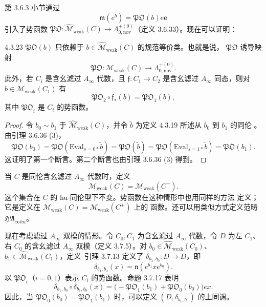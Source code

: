 第 3.6.3 小节通过
\[
 \mathfrak m(e^b)=\mathfrak{PO}(b)e\mathbf e
\]
引入了势函数
$\mathfrak{PO}\colon\widehat{\mathcal M}_{\mathrm{weak}}(C)
\to\Lambda^{+(0)}_{0,\mathrm{nov}}$（定义 3.6.33）。现在可以证明：

\begin{lemma}{4.3.23}\label{lem:4-3-23}
$\mathfrak{PO}(b)$ 只依赖于
$b\in\widehat{\mathcal M}_{\mathrm{weak}}(C)$ 的规范等价类。也就是说，
$\mathfrak{PO}$ 诱导映射
\[
 \mathfrak{PO}\colon
 \mathcal M_{\mathrm{weak}}(C)
 \longrightarrow\Lambda^{+(0)}_{0,\mathrm{nov}}.
\]
此外，若 $C_i$ 是含幺滤过 $A_\infty$ 代数，且
$\mathfrak f\colon C_1\to C_2$ 是含幺滤过 $A_\infty$ 同态，则对
$b\in\mathcal M_{\mathrm{weak}}(C_1)$ 有
\[
 \mathfrak{PO}_2\circ\mathfrak f_*(b)=\mathfrak{PO}_1(b),
\]
其中 $\mathfrak{PO}_i$ 是 $C_i$ 的势函数。
\end{lemma}

\begin{proof}
令
$b_0\sim b_1$ 于 $\widehat{\mathcal M}_{\mathrm{weak}}(C)$，并令
$\widetilde b$ 为定义 4.3.19 所述从 $b_0$ 到 $b_1$ 的同伦
。由引理 3.6.36 (3)，
\[
 \mathfrak{PO}(b_0)
 =\mathfrak{PO}(\mathrm{Eval}_{s=0*}\widetilde b)
 =\mathfrak{PO}(\widetilde b)
 =\mathfrak{PO}(\mathrm{Eval}_{s=1*}\widetilde b)
 =\mathfrak{PO}(b_1).
\]
这证明了第一个断言。第二个断言也由引理 3.6.36 (3) 得到。
\end{proof}

当 $C$ 是同伦含幺滤过 $A_\infty$ 代数时，定义
\begin{equation}
 \mathcal M_{\mathrm{weak}}(C)
 =\mathcal M_{\mathrm{weak}}(C^+).
\tag{4.3.24}\label{eq:4-3-24}
\end{equation}
这个集合在 $C$ 的 hu-同伦型下不变。势函数在这种情形中也用同样的方法
定义；它是定义在
$\mathcal M_{\mathrm{weak}}(C)=\mathcal M_{\mathrm{weak}}(C^+)$ 上的
函数。还可以用类似方式定义范畴 $\mathfrak{HA}_{\infty hu}$。

现在考虑滤过 $A_\infty$ 双模的情形。令 $C_0,C_1$ 为含幺滤过
$A_\infty$ 代数，令 $D$ 为左 $C_1$、右 $C_0$ 的含幺滤过
$A_\infty$ 双模（定义 3.7.5）。对
$b_0\in\widehat{\mathcal M}_{\mathrm{weak}}(C_0)$、
$b_1\in\widehat{\mathcal M}_{\mathrm{weak}}(C_1)$，定义--引理
3.7.13 定义了
$\delta_{b_1,b_0}\colon D\to D$，即
\[
 \delta_{b_1,b_0}(x)=\mathfrak n(e^{b_1}xe^{b_0}).
\]
以 $\mathfrak{PO}_i$（$i=0,1$）表示 $C_i$ 的势函数。命题 3.7.17
表明
\[
 \delta_{b_1,b_0}\circ\delta_{b_1,b_0}(x)
 =\bigl(-\mathfrak{PO}_1(b_1)+\mathfrak{PO}_0(b_0)\bigr)ex.
\]
因此，当 $\mathfrak{PO}_0(b_0)=\mathfrak{PO}_1(b_1)$ 时，可以定义
$(D,\delta_{b_1,b_0})$ 的上同调。


